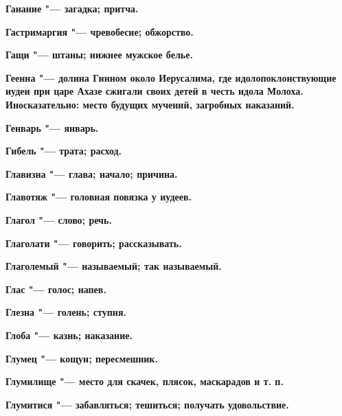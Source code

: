 \bfseries Ганание \normalfont{} "--- загадка; притча. 




\bfseries Гастримаргия \normalfont{} "--- чревобесие; обжорство. 




\bfseries Гащи \normalfont{} "--- штаны; нижнее мужское белье. 




\bfseries Геенна \normalfont{} "--- долина Гинном около Иерусалима, где идолопоклонствующие иудеи при царе Ахазе сжигали своих детей в честь идола Молоха. Иносказательно: место будущих мучений, загробных наказаний. 




\bfseries Генварь \normalfont{} "--- январь. 




\bfseries Гибель \normalfont{} "--- трата; расход. 




\bfseries Главизна \normalfont{} "--- глава; начало; причина. 




\bfseries Главотяж \normalfont{} "--- головная повязка у иудеев. 




\bfseries Глагол \normalfont{} "--- слово; речь. 




\bfseries Глаголати \normalfont{} "--- говорить; рассказывать. 




\bfseries Глаголемый \normalfont{} "--- называемый; так называемый. 




\bfseries Глас \normalfont{} "--- голос; напев. 




\bfseries Глезна \normalfont{} "--- голень; ступня. 




\bfseries Глоба \normalfont{} "--- казнь; наказание. 




\bfseries Глумец \normalfont{} "--- кощун; пересмешник. 




\bfseries Глумилище \normalfont{} "--- место для скачек, плясок, маскарадов и т. п. 




\bfseries Глумитися \normalfont{} "--- забавляться; тешиться; получать удовольствие. 




